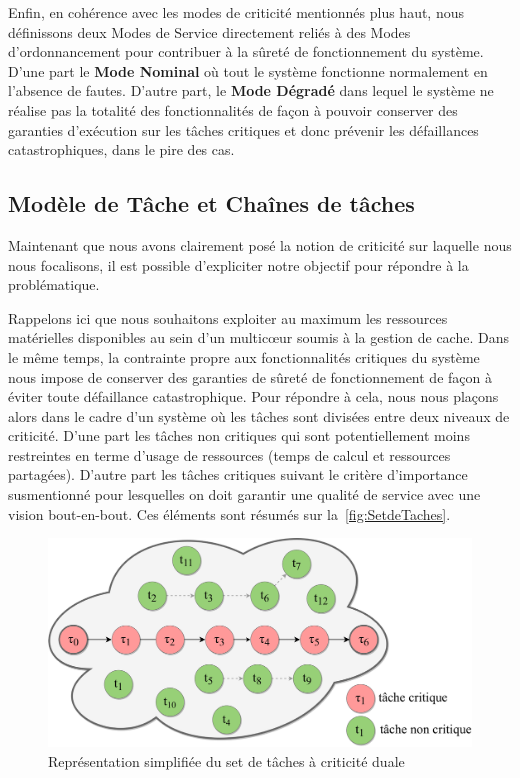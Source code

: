 \documentclass[french, a4paper, 11pt, twoside, pdftex]{StyleThese}
\begin{document}
    Enfin, en cohérence avec les modes de criticité mentionnés plus haut, nous définissons deux Modes de Service directement reliés à des Modes d'ordonnancement pour contribuer à la sûreté de fonctionnement du système. D'une part le \textbf{Mode Nominal} où tout le système fonctionne normalement en l'absence de fautes. D'autre part, le \textbf{Mode Dégradé} dans lequel le système ne réalise pas la totalité des fonctionnalités de façon à pouvoir conserver des garanties d'exécution sur les tâches critiques et donc prévenir les défaillances catastrophiques, dans le pire des cas.
    

    \subsection{Modèle de Tâche et Chaînes de tâches}
    	Maintenant que nous avons clairement posé la notion de criticité sur laquelle nous nous focalisons, il est possible d'expliciter notre objectif pour répondre à la problématique.
    	
    	Rappelons ici que nous souhaitons exploiter au maximum les ressources matérielles disponibles au sein d'un multicœur soumis à la gestion de cache.
    	Dans le même temps, la contrainte propre aux fonctionnalités critiques du système nous impose de conserver des garanties de sûreté de fonctionnement de façon à éviter toute défaillance catastrophique.
    	Pour répondre à cela, nous nous plaçons alors dans le cadre d'un système où les tâches sont divisées entre deux niveaux de criticité. D'une part les tâches non critiques qui sont potentiellement moins restreintes en terme d'usage de ressources (temps de calcul et ressources partagées). D'autre part les tâches critiques suivant le critère d'importance susmentionné pour lesquelles on doit garantir une qualité de service avec une vision bout-en-bout. Ces éléments sont résumés sur la~\autoref{fig:SetdeTaches}.
    	
    	\begin{figure}[th]
    		\centering
    		\includegraphics[width=0.8\linewidth]{schemas/Set_de_Taches}
    		\caption{Représentation simplifiée du set de tâches à criticité duale}
    		\label{fig:SetdeTaches}
    	\end{figure}
    	
\end{document}
